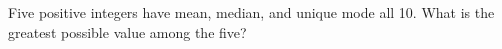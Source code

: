 Five positive integers have mean, median, and unique mode all 10. What is the greatest possible value among the five?
